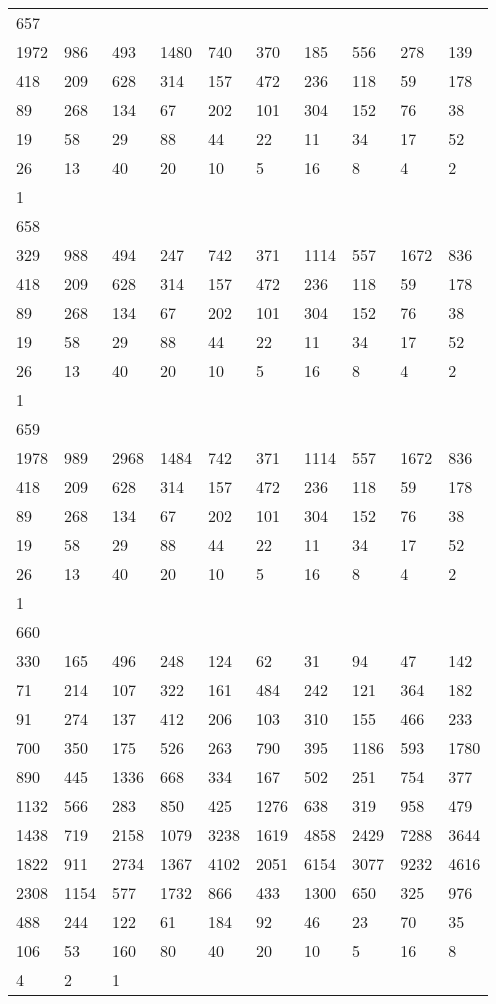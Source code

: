 \begin{longtable}{*{10}{l}}
657&&&&&&&&&\\
1972& 986& 493& 1480& 740& 370& 185& 556& 278& 139\\
418& 209& 628& 314& 157& 472& 236& 118& 59& 178\\
89& 268& 134& 67& 202& 101& 304& 152& 76& 38\\
19& 58& 29& 88& 44& 22& 11& 34& 17& 52\\
26& 13& 40& 20& 10& 5& 16& 8& 4& 2\\
1& \\

658&&&&&&&&&\\
329& 988& 494& 247& 742& 371& 1114& 557& 1672& 836\\
418& 209& 628& 314& 157& 472& 236& 118& 59& 178\\
89& 268& 134& 67& 202& 101& 304& 152& 76& 38\\
19& 58& 29& 88& 44& 22& 11& 34& 17& 52\\
26& 13& 40& 20& 10& 5& 16& 8& 4& 2\\
1& \\

659&&&&&&&&&\\
1978& 989& 2968& 1484& 742& 371& 1114& 557& 1672& 836\\
418& 209& 628& 314& 157& 472& 236& 118& 59& 178\\
89& 268& 134& 67& 202& 101& 304& 152& 76& 38\\
19& 58& 29& 88& 44& 22& 11& 34& 17& 52\\
26& 13& 40& 20& 10& 5& 16& 8& 4& 2\\
1& \\

660&&&&&&&&&\\
330& 165& 496& 248& 124& 62& 31& 94& 47& 142\\
71& 214& 107& 322& 161& 484& 242& 121& 364& 182\\
91& 274& 137& 412& 206& 103& 310& 155& 466& 233\\
700& 350& 175& 526& 263& 790& 395& 1186& 593& 1780\\
890& 445& 1336& 668& 334& 167& 502& 251& 754& 377\\
1132& 566& 283& 850& 425& 1276& 638& 319& 958& 479\\
1438& 719& 2158& 1079& 3238& 1619& 4858& 2429& 7288& 3644\\
1822& 911& 2734& 1367& 4102& 2051& 6154& 3077& 9232& 4616\\
2308& 1154& 577& 1732& 866& 433& 1300& 650& 325& 976\\
488& 244& 122& 61& 184& 92& 46& 23& 70& 35\\
106& 53& 160& 80& 40& 20& 10& 5& 16& 8\\
4& 2& 1& \\


\end{longtable}
